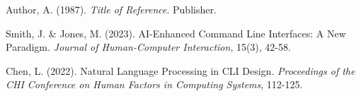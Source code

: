 Author, A. (1987). \textit{Title of Reference}. Publisher.

Smith, J. \& Jones, M. (2023). AI-Enhanced Command Line Interfaces: A New Paradigm. \textit{Journal of Human-Computer Interaction}, 15(3), 42-58.

Chen, L. (2022). Natural Language Processing in CLI Design. \textit{Proceedings of the CHI Conference on Human Factors in Computing Systems}, 112-125.
